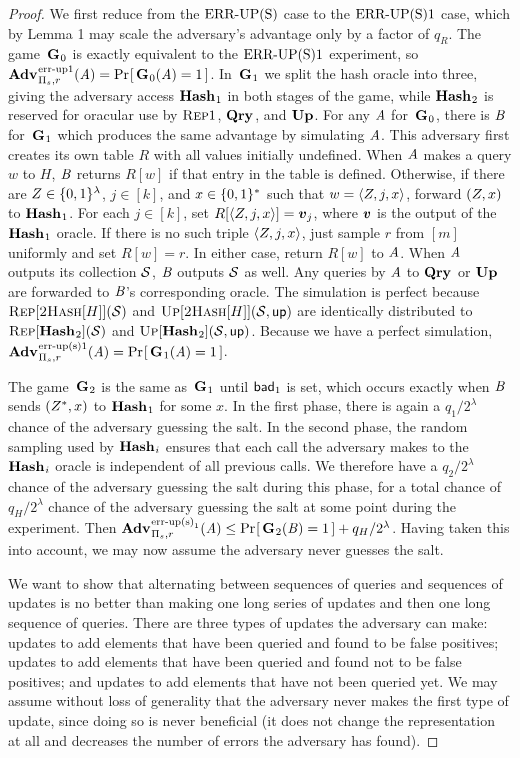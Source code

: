 \begin{proof} We first reduce from the $\textnormal{ERR\mbox{-}UP(S)}$ case to the $\textnormal{ERR\mbox{-}UP(S)}1$ case, which by Lemma 1 may scale the adversary's advantage only by a factor of $q_R$. The game~$\mathbf{G}\hspace{0.5pt}_0$ is exactly equivalent to the $\textnormal{ERR\mbox{-}UP(S)}1$ experiment, so $\Adv{\errep1}_{\struct_s,r}(\advA) = \Prob{\G_0(\advA) = 1}$. In~$\mathbf{G}\hspace{0.5pt}_1$ we split the hash oracle into three, giving the adversary access $\mathbf{Hash}\hspace{0.5pt}_1$ in both stages of the game, while $\mathbf{Hash}\hspace{0.5pt}_2$ is reserved for oracular use by $\textsc{Rep}1$, $\mathbf{Qry}\hspace{0.5pt}$, and $\mathbf{Up}\hspace{0.5pt}$. For any $\mathit{A}$ for~$\mathbf{G}\hspace{0.5pt}_0$, there is $\mathit{B}$ for~$\mathbf{G}\hspace{0.5pt}_1$ which produces the same advantage by simulating $\mathit{A}$. This adversary first creates its own table $R$ with all values initially undefined. When $\mathit{A}$ makes a query $w$ to $H$, $\mathit{B}$ returns $R[w]$ if that entry in the table is defined. Otherwise, if there are $Z \in \{0,1\}^\lambda$, $j \in [k]$, and $x \in \{0,1\}^*$ such that $w = \langle Z, j, x\rangle$, forward $(Z,x)$ to $\mathbf{Hash}\hspace{0.5pt}_1$. For each $j \in [k]$, set $R[\langle\salt, j, x\rangle] = \vv_j$, where $\vv$ is the output of the $\mathbf{Hash}\hspace{0.5pt}_1$ oracle. If there is no such triple $\langle Z, j, x\rangle$, just sample $r$ from $[m]$ uniformly and set $R[w] = r$. In either case, return $R[w]$ to $\mathit{A}$. When $\mathit{A}$ outputs its collection $\mathcal{S}$, $\mathit{B}$ outputs $\mathcal{S}$ as well. Any queries by $\mathit{A}$ to $\mathbf{Qry}\hspace{0.5pt}$ or $\mathbf{Up}\hspace{0.5pt}$ are forwarded to $\mathit{B}$'s corresponding oracle. The simulation is perfect because $\textsc{Rep}[\textsc{2Hash}[H]](\mathcal{S})$ and $\textsc{Up}[\textsc{2Hash}[H]](\mathcal{S},\mathsf{up})$ are identically distributed to $\textsc{Rep}[\mathbf{Hash}\hspace{0.5pt}_2](\mathcal{S})$ and $\textsc{Up}[\mathbf{Hash}\hspace{0.5pt}_2](\mathcal{S},\mathsf{up})$. Because we have a perfect simulation, $\Adv{\erreps1}_{\struct_s,r}(\advA) = \Prob{\G_1(\advA) = 1}$.

The game~$\mathbf{G}\hspace{0.5pt}_2$ is the same as~$\mathbf{G}\hspace{0.5pt}_1$ until $\mathsf{bad}_1$ is set, which occurs exactly when $\mathit{B}$ sends $(Z^*,x)$ to $\mathbf{Hash}\hspace{0.5pt}_1$ for some $x$. In the first phase, there is again a $q_1/2^\lambda$ chance of the adversary guessing the salt. In the second phase, the random sampling used by $\mathbf{Hash}\hspace{0.5pt}_i$ ensures that each call the adversary makes to the $\mathbf{Hash}\hspace{0.5pt}_i$ oracle is independent of all previous calls. We therefore have a $q_2/2^\lambda$ chance of the adversary guessing the salt during this phase, for a total chance of $q_H/2^\lambda$ chance of the adversary guessing the salt at some point during the experiment. Then $\Adv{\erreps_1}_{\struct_s,r}(\advA) \le \Prob{\G_2(\advB) = 1} + q_H/2^\lambda$. Having taken this into account, we may now assume the adversary never guesses the salt.

We want to show that alternating between sequences of queries and sequences of updates is no better than making one long series of updates and then one long sequence of queries. There are three types of updates the adversary can make: updates to add elements that have been queried and found to be false positives; updates to add elements that have been queried and found not to be false positives; and updates to add elements that have not been queried yet. We may assume without loss of generality that the adversary never makes the first type of update, since doing so is never beneficial (it does not change the representation at all and decreases the number of errors the adversary has found).


\end{proof}

